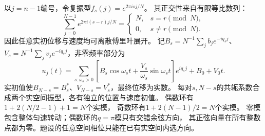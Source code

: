 \documentclass[UTF8,fontset=fandol,a4paper,11pt]{ctexart}
\begin{document}
以$j=n-1$编号，令复振型$f_s(j)=e^{2\pi isj/N}$。
其正交性来自有限等比数列：
\[
\sum_{j=0}^{N-1}e^{2\pi i(s-r)j/N}
=\begin{cases}N,&s=r\pmod N,\\0,&s\ne r\pmod N.\end{cases}
\]
因此任意实初位移与速度均可离散傅里叶展开。
记$B_s=N^{-1}\sum_j b_j e^{-iq_sj}$、
$V_s=N^{-1}\sum_j v_j e^{-iq_sj}$，非零频率部分为
\[
u_j(t)=\sum_{s:\omega_s>0}
\left[B_s\cos\omega_st+\frac{V_s}{\omega_s}\sin\omega_st\right]e^{iq_sj}
+B_0+V_0t.
\]
实初值使$B_{N-s}=B_s^*$、$V_{N-s}=V_s^*$，最终位移为实数。
每对$s,N-s$的共轭系数合成两个实空间振型，各有独立的位置与速度初值。
偶数环有$1+2(N/2-1)+1=N$个实模，
奇数环有$1+2(N-1)/2=N$个实模。
零模包含整体匀速转动；偶数环的$q=\pi$模只有交错余弦方向，
其正弦向量在所有整数点都为零。题设的任意空间相位只能在已有实空间内选方向。
\end{document}
